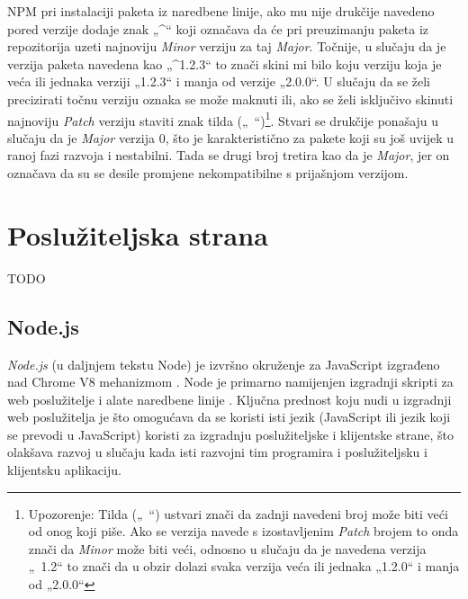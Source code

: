 \documentclass[times, utf8, diplomski, numeric]{fer}
\newcommand{\razmakp}{\vspace{18pt}}
\begin{document}
\razmakp

NPM pri instalaciji paketa iz naredbene linije, ako mu nije drukčije navedeno pored verzije dodaje znak „\string^“ koji označava da će pri preuzimanju paketa iz repozitorija uzeti najnoviju \emph{Minor} verziju za taj \emph{Major}.
Točnije, u slučaju da je verzija paketa navedena kao „\string^1.2.3“ to znači skini mi bilo koju verziju koja je veća ili jednaka verziji „1.2.3“ i manja od verzije „2.0.0“.
U slučaju da se želi precizirati točnu verziju oznaka se može maknuti ili, ako se želi isključivo skinuti najnoviju \emph{Patch} verziju staviti znak tilda („\string~“)\footnote{
    Upozorenje: Tilda („\string~“) ustvari znači da zadnji navedeni broj može biti veći od onog koji piše. Ako se verzija navede s izostavljenim \emph{Patch} brojem to onda znači da \emph{Minor} može biti veći, odnosno u slučaju da je navedena verzija „\string~1.2“ to znači da u obzir dolazi svaka verzija veća ili jednaka „1.2.0“ i manja od „2.0.0“
}.
Stvari se drukčije ponašaju u slučaju da je \emph{Major} verzija 0, što je karakteristično za pakete koji su još uvijek u ranoj fazi razvoja i nestabilni.
Tada se drugi broj tretira kao da je \emph{Major}, jer on označava da su se desile promjene nekompatibilne s prijašnjom verzijom\citep{npm_docs}.


\newpage
\section{Poslužiteljska strana}

TODO


\subsection{Node.js}

\emph{Node.js} (u daljnjem tekstu Node) je izvršno okruženje za JavaScript izgrađeno nad Chrome V8 mehanizmom .
Node je primarno namijenjen izgradnji skripti za web poslužitelje i alate naredbene linije .
Ključna prednost koju nudi u izgradnji web poslužitelja je što omogućava da se koristi isti jezik (JavaScript ili jezik koji se prevodi u JavaScript) koristi za izgradnju poslužiteljske i klijentske strane, što olakšava razvoj u slučaju kada isti razvojni tim programira i poslužiteljsku i klijentsku aplikaciju\citep{wiki_node}.
\end{document}
